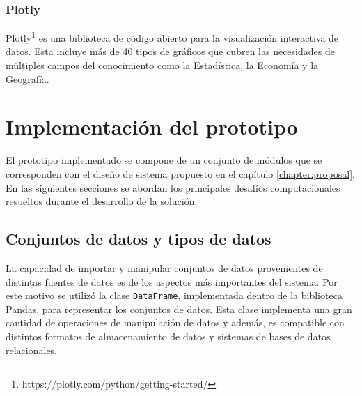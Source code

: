 \subsubsection{Plotly}

Plotly\footnote[7]{https://plotly.com/python/getting-started/} es una biblioteca
de c\'odigo abierto para la visualizaci\'on interactiva de datos. Esta incluye m\'as
de 40 tipos de gr\'aficos que cubren las necesidades de m\'ultiples campos del
conocimiento como la Estad\'istica, la Econom\'ia y la Geograf\'ia.




\section{Implementaci\'on del prototipo}

El prototipo implementado se compone de un conjunto de m\'odulos que se corresponden
con el dise\~no de sistema propuesto en el cap\'itulo \ref{chapter:proposal}. En las siguientes
secciones se abordan los principales desaf\'ios computacionales resueltos durante el desarrollo
de la soluci\'on.


\subsection{Conjuntos de datos y tipos de datos}
La capacidad de importar y manipular
conjuntos de datos provenientes de distintas fuentes de datos es de los aspectos m\'as importantes
del sistema. Por este motivo se utiliz\'o
la clase \texttt{DataFrame}, implementada dentro de la biblioteca Pandas, para representar
los conjuntos de datos. Esta clase implementa una gran cantidad
de operaciones de manipulaci\'on de datos y adem\'as, es compatible con distintos
formatos de almacenamiento de datos y sistemas de bases de datos relacionales.


